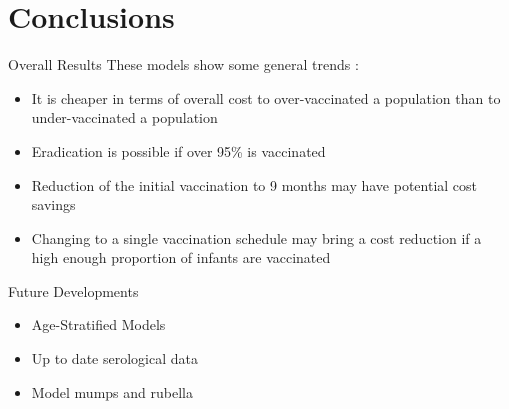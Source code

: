 \documentclass{beamer}
\begin{document}
\section{Conclusions}
\begin{frame}{Overall Results}
These models show some general trends :
\begin{itemize}
\item {It is cheaper in terms of overall cost to over-vaccinated a population than to under-vaccinated a population}
\item {Eradication is possible if over 95\% is vaccinated}
\item {Reduction of the initial vaccination to 9 months may have potential cost savings}
\item {Changing to a single vaccination schedule may bring a cost reduction if a high enough proportion of infants are vaccinated}
\end{itemize}
\end{frame}

\begin{frame}{Future Developments}
\begin{itemize}
	\item{Age-Stratified Models}
	\item{Up to date serological data}
	\item{Model mumps and rubella}
\end{itemize}
\end{frame}
\end{document}
